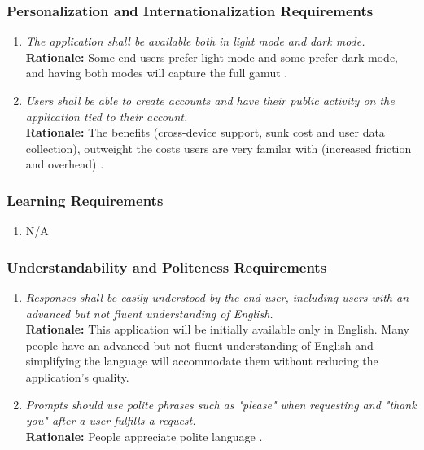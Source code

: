 \documentclass[]{article}
\begin{document}
\subsubsection{Personalization and Internationalization Requirements}
\label{ssub:personalization_and_internationalization_requirements}
\begin{enumerate}[{UH-PI}1. ]
    \item \textit{The application shall be available both in light mode and dark mode.} \\ \textbf{Rationale:} Some end users prefer light mode and some prefer dark mode, and having both modes will capture the full gamut \cite{NNgroup}. 
    \item \textit{Users shall be able to create accounts and have their public activity on the application tied to their account.} \\ \textbf{Rationale:} The benefits (cross-device support, sunk cost and user data collection), outweight the costs users are very familar with (increased friction and overhead) \cite{phiture2017}.
\end{enumerate}

\subsubsection{Learning Requirements}
\label{ssub:learning_requirements}
\begin{enumerate}[{UH-L}1. ]
	\item N/A
\end{enumerate}

\subsubsection{Understandability and Politeness Requirements}
\label{ssub:understandability_and_politeness_requirements}
\begin{enumerate}[{UH-UP}1. ]
	\item \textit{Responses shall be easily understood by the end user, including users with an advanced but not fluent understanding of English.} \\ \textbf{Rationale:} This application will be initially available only in English. Many people have an advanced but not fluent understanding of English \cite{USCensus} and simplifying the language will accommodate them without reducing the application's quality.
        \item \textit{Prompts should use polite phrases such as "please" when requesting and "thank you" after a user fulfills a request.} \\ \textbf{Rationale:} People appreciate polite language \cite{Standford}.
\end{enumerate}
\end{document}
